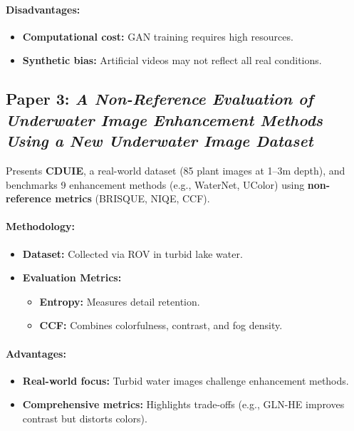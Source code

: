 \documentclass{article}
\begin{document}
\paragraph{Disadvantages:}
\begin{itemize}
    \item \textbf{Computational cost:} GAN training requires high resources.
    \item \textbf{Synthetic bias:} Artificial videos may not reflect all real conditions.
\end{itemize}

\subsection{Paper 3: \textit{A Non-Reference Evaluation of Underwater Image Enhancement Methods Using a New Underwater Image Dataset\cite{Saleem_2023}}}

Presents \textbf{CDUIE}, a real-world dataset (85 plant images at 1--3m depth), and benchmarks 9 enhancement methods (e.g., WaterNet, UColor) using \textbf{non-reference metrics} (BRISQUE, NIQE, CCF).

\paragraph{Methodology:}
\begin{itemize}
    \item \textbf{Dataset:} Collected via ROV in turbid lake water.
    \item \textbf{Evaluation Metrics:}
          \begin{itemize}
              \item \textbf{Entropy:} Measures detail retention.
              \item \textbf{CCF:} Combines colorfulness, contrast, and fog density.
          \end{itemize}
\end{itemize}

\paragraph{Advantages:}
\begin{itemize}
    \item \textbf{Real-world focus:} Turbid water images challenge enhancement methods.
    \item \textbf{Comprehensive metrics:} Highlights trade-offs (e.g., GLN-HE improves contrast but distorts colors).
\end{itemize}
\end{document}
